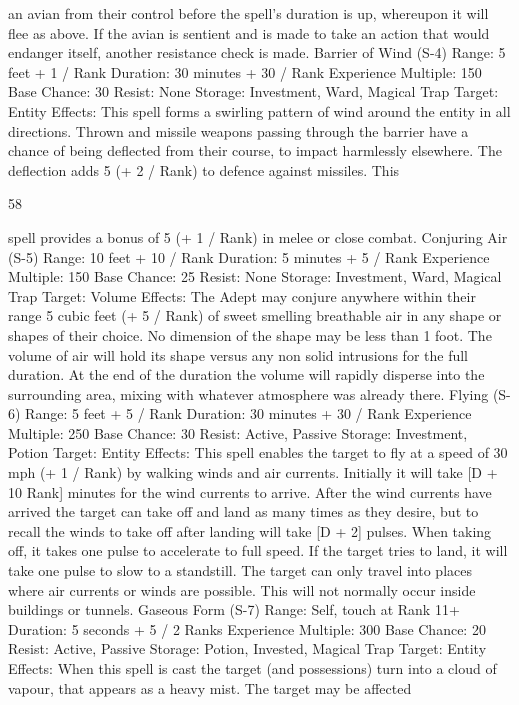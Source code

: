 \documentclass[a4paper]{article}
\begin{document}
\begin{multicols}{3}
an avian from their control before the spell’s duration is up, whereupon it will flee as above. If the
avian is sentient and is made to take an action that
would endanger itself, another resistance check is
made.
Barrier of Wind (S-4)
Range: 5 feet + 1 / Rank
Duration: 30 minutes + 30 / Rank
Experience Multiple: 150
Base Chance: 30%
Resist: None
Storage: Investment, Ward, Magical Trap
Target: Entity
Effects: This spell forms a swirling pattern of wind
around the entity in all directions. Thrown and
missile weapons passing through the barrier have a
chance of being deflected from their course, to
impact harmlessly elsewhere. The deflection adds
5 (+ 2 / Rank) to defence against missiles. This

58

spell provides a bonus of 5 (+ 1 / Rank) in melee or
close combat.
Conjuring Air (S-5)
Range: 10 feet + 10 / Rank
Duration: 5 minutes + 5 / Rank
Experience Multiple: 150
Base Chance: 25%
Resist: None
Storage: Investment, Ward, Magical Trap
Target: Volume
Effects: The Adept may conjure anywhere within
their range 5 cubic feet (+ 5 / Rank) of sweet
smelling breathable air in any shape or shapes of
their choice. No dimension of the shape may be
less than 1 foot. The volume of air will hold its
shape versus any non solid intrusions for the full
duration. At the end of the duration the volume will
rapidly disperse into the surrounding area, mixing
with whatever atmosphere was already there.
Flying (S-6)
Range: 5 feet + 5 / Rank
Duration: 30 minutes + 30 / Rank
Experience Multiple: 250
Base Chance: 30%
Resist: Active, Passive
Storage: Investment, Potion
Target: Entity
Effects: This spell enables the target to fly at a
speed of 30 mph (+ 1 / Rank) by walking winds
and air currents. Initially it will take [D + 10 Rank] minutes for the wind currents to arrive.
After the wind currents have arrived the target can
take off and land as many times as they desire, but
to recall the winds to take off after landing will
take [D + 2] pulses. When taking off, it takes one
pulse to accelerate to full speed. If the target tries
to land, it will take one pulse to slow to a standstill.
The target can only travel into places where air
currents or winds are possible. This will not normally occur inside buildings or tunnels.
Gaseous Form (S-7)
Range: Self, touch at Rank 11+
Duration: 5 seconds + 5 / 2 Ranks
Experience Multiple: 300
Base Chance: 20%
Resist: Active, Passive
Storage: Potion, Invested, Magical Trap
Target: Entity
Effects: When this spell is cast the target (and
possessions) turn into a cloud of vapour, that appears as a heavy mist. The target may be affected

\end{multicols}
\end{document}
